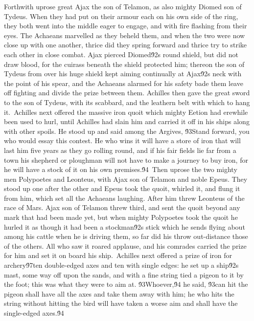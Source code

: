 {Forthwith uprose great Ajax the son of Telamon, as also mighty Diomed son of Tydeus. When they had put on their armour each on his own side of the ring, they both went into the middle eager to engage, and with fire flashing from their eyes. The Achaeans marvelled as they beheld them, and when the two were now close up with one another, thrice did they spring forward and thrice try to strike each other in close combat. Ajax pierced Diomed\'92s round shield, but did not draw blood, for the cuirass beneath the shield protected him; thereon the son of Tydeus from over his huge shield kept aiming continually at Ajax\'92s neck with the point of his spear, and the Achaeans alarmed for his safety bade them leave off fighting and divide the prize between them. Achilles then gave the great sword to the son of Tydeus, with its scabbard, and the leathern belt with which to hang it.\
Achilles next offered the massive iron quoit which mighty Eetion had erewhile been used to hurl, until Achilles had slain him and carried it off in his ships along with other spoils. He stood up and said among the Argives, \'93Stand forward, you who would essay this contest. He who wins it will have a store of iron that will last him five years as they go rolling round, and if his fair fields lie far from a town his shepherd or ploughman will not have to make a journey to buy iron, for he will have a stock of it on his own premises.\'94\
Then uprose the two mighty men Polypoetes and Leonteus, with Ajax son of Telamon and noble Epeus. They stood up one after the other and Epeus took the quoit, whirled it, and flung it from him, which set all the Achaeans laughing. After him threw Leonteus of the race of Mars. Ajax son of Telamon threw third, and sent the quoit beyond any mark that had been made yet, but when mighty Polypoetes took the quoit he hurled it as though it had been a stockman\'92s stick which he sends flying about among his cattle when he is driving them, so far did his throw out-distance those of the others. All who saw it roared applause, and his comrades carried the prize for him and set it on board his ship.\
Achilles next offered a prize of iron for archery\'97ten double-edged axes and ten with single edges: he set up a ship\'92s mast, some way off upon the sands, and with a fine string tied a pigeon to it by the foot; this was what they were to aim at. \'93Whoever,\'94 he said, \'93can hit the pigeon shall have all the axes and take them away with him; he who hits the string without hitting the bird will have taken a worse aim and shall have the single-edged axes.\'94\
}
